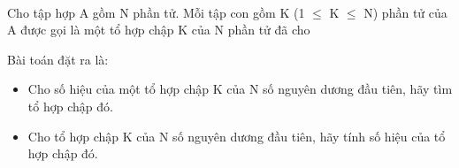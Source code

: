  

Cho tập hợp A gồm N phần tử. Mỗi tập con gồm K (1  $\le$  K  $\le$  N) phần tử của A được gọi là một tổ hợp chập K của N phần tử đã cho

Bài toán đặt ra là:
\begin{itemize}
	\item Cho số hiệu của một tổ hợp chập K của N số nguyên dương đầu tiên, hãy tìm tổ hợp chập đó.
	\item Cho tổ hợp chập K của N số nguyên dương đầu tiên, hãy tính số hiệu của tổ hợp chập đó.
\end{itemize}